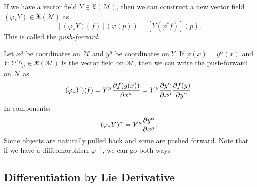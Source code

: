 \begin{definition}
  If we have a vector field $Y \in \mathfrak{X}(\mathcal{M})$, then we can construct a new vector field $(\varphi_* Y) \in \mathfrak{X}(\mathcal{N})$ as
  \begin{equation}
    \left[ (\varphi_* Y)(f) \right](\varphi(p)) = \left[ Y(\varphi^*f) \right] (p).
  \end{equation}
  This is called the \emph{push-forward}.
\end{definition}

Let $x^\mu$ be coordinates on $\mathcal{M}$ and $y^\mu$ be coordinates on $Y$. If $\varphi(x) = y^\alpha(x)$ and $Y: Y^\mu \partial_\mu \in \mathfrak{X}(\mathcal{M})$ is the vector field on $\mathcal{M}$, then we can write the push-forward on $\mathcal{N}$ as 
\begin{equation}
  (\varphi_* Y) (f) = Y^\mu \pdv{f(y(x))}{x^\mu} = Y^\mu \pdv{y^\alpha}{x^\mu} \pdv{f(y)}{y^\alpha}.
\end{equation}
In components:
\begin{equation}
  \label{eq:push-forward-of-tangent-vector}
  (\varphi_* Y)^\alpha = Y^\mu \pdv{y^\alpha}{x^\mu}.
\end{equation}
Some objects are naturally pulled back and some are pushed forward. Note that if we have a diffeomorphism $\varphi^{-1}$, we can go both ways.

\subsection{Differentiation by Lie Derivative}%
\label{sub:the_lie_derivative}

